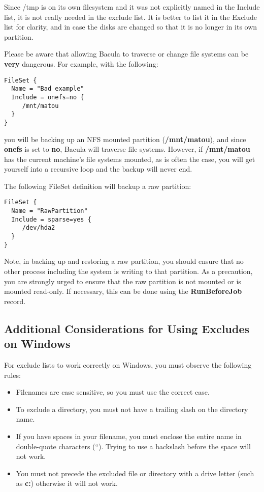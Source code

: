 Since /tmp is on its own filesystem and it was not explicitly named in the
Include list, it is not really needed in the exclude list. It is better to
list it in the Exclude list for clarity, and in case the disks are changed so
that it is no longer in its own partition. 

Please be aware that allowing Bacula to traverse or change file systems can be
{\bf very} dangerous. For example, with the following: 

\footnotesize
\begin{verbatim}
FileSet {
  Name = "Bad example"
  Include = onefs=no {
     /mnt/matou
  }
}
\end{verbatim}
\normalsize

you will be backing up an NFS mounted partition ({\bf /mnt/matou}), and since
{\bf onefs} is set to {\bf no}, Bacula will traverse file systems. However, if
{\bf /mnt/matou} has the current machine's file systems mounted, as is often
the case, you will get yourself into a recursive loop and the backup will
never end. 

The following FileSet definition will backup a raw partition: 

\footnotesize
\begin{verbatim}
FileSet {
  Name = "RawPartition"
  Include = sparse=yes {
     /dev/hda2
  }
}
\end{verbatim}
\normalsize

Note, in backing up and restoring a raw partition, you should ensure that no
other process including the system is writing to that partition. As a
precaution, you are strongly urged to ensure that the raw partition is not
mounted or is mounted read-only. If necessary, this can be done using the {\bf
RunBeforeJob} record. 

\subsection*{Additional Considerations for Using Excludes on Windows}

For exclude lists to work correctly on Windows, you must observe the following
rules: 

\begin{itemize}
\item Filenames are case sensitive, so you must use the correct case.  
\item To exclude a directory, you must not have a trailing slash on the 
directory name.  
\item If you have spaces in your filename, you must enclose the entire name 
in double-quote characters (``). Trying to use a backslash before  the space
will not work.  
\item You must not precede the excluded file or directory with a drive  letter
(such as {\bf c:}) otherwise it will not work. 
\end{itemize}

